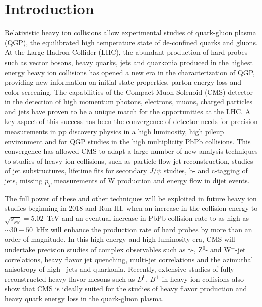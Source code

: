 \section{Introduction}
\label{sec:intro}

Relativistic heavy ion collisions allow experimental studies of quark-gluon plasma (QGP), the equilibrated high temperature state of de-confined quarks and gluons. At the Large Hadron Collider (LHC), the abundant production of hard probes such as vector bosons, heavy quarks, jets and quarkonia produced in the highest energy heavy ion collisions has opened a new era in the characterization of QGP, providing new information on initial state properties, parton energy loss and color screening. The capabilities of the Compact Muon Solenoid (CMS) detector in the detection of high momentum photons, electrons, muons, charged particles and jets have proven to be a unique match for the opportunities at the LHC. A key aspect of this success has been the convergence of detector needs for precision measurements in pp discovery physics in a high luminosity, high pileup environment and for QGP studies in the high multiplicity PbPb collisions. This convergence has allowed CMS to adapt a large number of new analysis techniques to studies of heavy ion collisions, such as particle-flow jet reconstruction, studies of jet substructures, lifetime fits for secondary $J/\psi$ studies,  b- and c-tagging of jets, missing $p_T$ measurements of W production and energy flow in dijet events. 

The full power of these and other techniques will be exploited in future heavy ion studies beginning in 2018 and Run III, when an increase in the collision energy to $\sqrt{s_{_{NN}}} = 5.02$~TeV and an eventual increase in PbPb collision rate to as high as $\sim 30-50$~kHz will enhance the production rate of hard probes by more than an order of magnitude. In this high energy and high luminosity era, CMS will undertake precision studies of complex observables such as $\gamma$-, Z$^0$- and W$^\pm$-jet correlations, heavy flavor jet quenching, multi-jet correlations and the azimuthal anisotropy of high \pt\ jets and quarkonia. Recently, extensive studies of fully reconstructed heavy flavor mesons such as $D^0$, $B^+$ in heavy ion collisions also show that CMS is ideally suited for the studies of heavy flavor production and heavy quark energy loss in the quark-gluon plasma.

